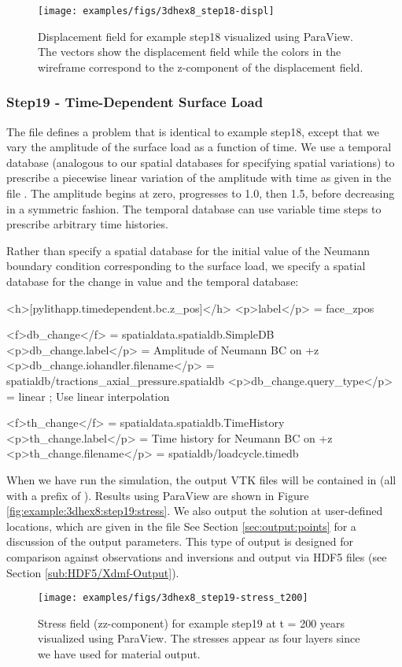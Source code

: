 \begin{figure}
  \texttt{[image: examples/figs/3dhex8\_step18-displ]}
  \caption{Displacement field for example step18 visualized using ParaView. The
    vectors show the displacement field while the colors in the wireframe
    correspond to the z-component of the displacement field.}
  \label{fig:example:3dhex8:step18:displacement}
\end{figure}


\subsubsection{Step19 - Time-Dependent Surface Load}

The  file defines a problem that is identical to
example step18, except that we vary the amplitude of the surface load
as a function of time. We use a temporal database (analogous to our
spatial databases for specifying spatial variations) to prescribe
a piecewise linear variation of the amplitude with time as given in
the file . The amplitude begins
at zero, progresses to 1.0, then 1.5, before decreasing in a symmetric
fashion. The temporal database can use variable time steps to prescribe
arbitrary time histories. 

Rather than specify a spatial database for the initial value of the
Neumann boundary condition corresponding to the surface load, we specify
a spatial database for the change in value and the temporal database:
\begin{cfg}
<h>[pylithapp.timedependent.bc.z_pos]</h>
<p>label</p> = face_zpos

<f>db_change</f> = spatialdata.spatialdb.SimpleDB
<p>db_change.label</p> = Amplitude of Neumann BC on +z
<p>db_change.iohandler.filename</p> = spatialdb/tractions_axial_pressure.spatialdb
<p>db_change.query_type</p> = linear ; Use linear interpolation

<f>th_change</f> = spatialdata.spatialdb.TimeHistory
<p>th_change.label</p> = Time history for Neumann BC on +z
<p>th_change.filename</p> = spatialdb/loadcycle.timedb
\end{cfg}
When we have run the simulation, the output VTK files will be contained
in  (all with a prefix of ).
Results using ParaView are shown in Figure \vref{fig:example:3dhex8:step19:stress}.
We also output the solution at user-defined locations, which are given
in the file  See Section \vref{sec:output:points}
for a discussion of the output parameters. This type of output is
designed for comparison against observations and inversions and output
via HDF5 files (see Section \vref{sub:HDF5/Xdmf-Output}).

\begin{figure}
  \texttt{[image: examples/figs/3dhex8\_step19-stress\_t200]}
  \caption{Stress field (zz-component) for example step19 at t = 200
    years visualized using ParaView. The stresses appear as four
    layers since we have used  for material
    output.}
  \label{fig:example:3dhex8:step19:stress}
\end{figure}

